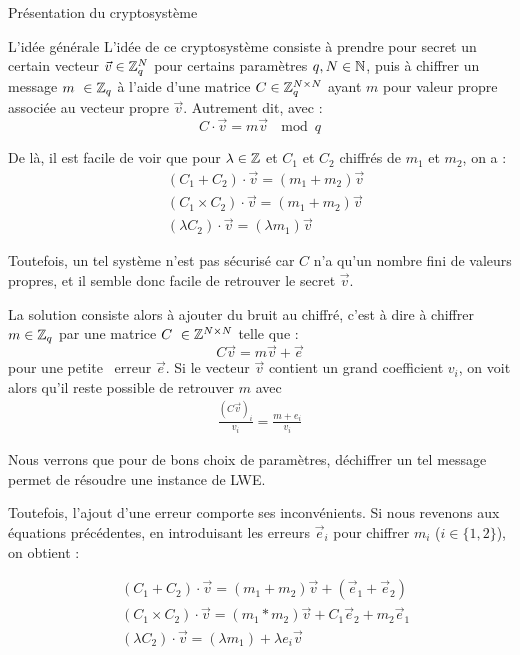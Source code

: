 \begin{section}{Présentation du cryptosystème}
	\begin{subsection}{L'idée générale}
	L'idée de ce cryptosystème consiste à prendre pour secret un certain vecteur $\vec{v} \in \mathbb{Z}_q^N$ pour certains paramètres $q, N \in \mathbb{N}$, puis à chiffrer un message $m \in \ZZq$ à l'aide d'une matrice $C \in \mathbb{Z}_q^{N \times N}$ ayant $m$ pour valeur propre associée au vecteur propre $\vec{v}$. Autrement dit, avec :
\[C \cdot \vec{v} = m \vec{v}\: \mod q \]

	De là, il est facile de voir que pour $\lambda \in \mathbb{Z}$ et  $C_1$ et $C_2$ chiffrés de $m_1$ et $m_2$, on a :
	\begin{align*}
	& (C_1 + C_2) \cdot \vec{v} = (m_1 + m_2) \vec{v} \\
	& (C_1 \times C_2) \cdot \vec{v} = (m_1 + m_2) \vec{v} \\
	& (\lambda  C_2) \cdot \vec{v} = (\lambda m_1) \vec{v} 
	\end{align*}

	Toutefois, un tel système n'est pas sécurisé car $C$ n'a qu'un nombre fini de valeurs propres, et il semble donc facile de retrouver le secret $\vec{v}$.

	La solution consiste alors à ajouter du bruit au chiffré, c'est à dire à chiffrer $m\in \ZZq$ par une matrice $C \in \ZZ^{N \times N}$ telle que :
	\[ C \vec{v} = m \vec{v} + \vec{e} \]
	pour une \og petite \fg \ erreur $\vec{e}$. Si le vecteur $\vec{v}$ contient un grand coefficient $v_i$, on voit alors qu'il reste possible de retrouver $m$ avec
	\begin{align*}
	\frac{{(C \vec{v})}_i}{v_i} = \frac{m + e_i}{v_i}
	\end{align*}
	
	Nous verrons que pour de bons choix de paramètres, déchiffrer un tel message permet de résoudre une instance de LWE.

	Toutefois, l'ajout d'une erreur comporte ses inconvénients. Si nous revenons aux équations précédentes, en introduisant les erreurs $\vec{e}_i$ pour chiffrer  $m_i$ ($i\in \{1,2\}$), on obtient :

	\begin{align*}
	& (C_1 + C_2) \cdot \vec{v} = (m_1 + m_2) \vec{v} + (\vec{e}_1 + \vec{e}_2)\\
	& (C_1 \times C_2) \cdot \vec{v} = (m_1 * m_2) \vec{v} + C_1 \vec{e}_2 + m_2\vec{e}_1 \\
	& (\lambda  C_2) \cdot \vec{v} = (\lambda m_1) + \lambda e_i\vec{v} 
	\end{align*}


\end{subsection}
\end{section}
